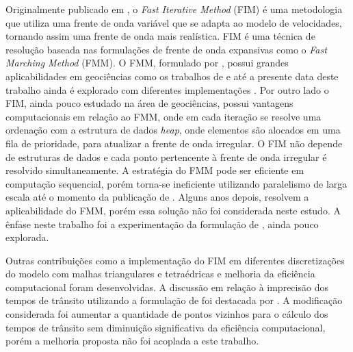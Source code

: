 Originalmente publicado em , o \textit{Fast Iterative Method} (FIM) é uma metodologia que utiliza uma frente de onda variável que se adapta ao modelo de velocidades, tornando assim uma frente de onda mais realística. FIM é uma técnica de resolução baseada nas formulações de frente de onda expansivas como o \textit{Fast Marching Method} (FMM). O FMM, formulado por , possui grandes aplicabilidades em geociências como os trabalhos de  e até a presente data deste trabalho ainda é explorado com diferentes implementações \cite{white2020pykonal, chenpyekfmm2023}. Por outro lado o FIM, ainda pouco estudado na área de geociências, possui vantagens computacionais em relação ao FMM, onde em cada iteração se resolve uma ordenação com a estrutura de dados \textit{heap}, onde elementos são alocados em uma fila de prioridade, para atualizar a frente de onda irregular. O FIM não depende de estruturas de dados e cada ponto pertencente à frente de onda irregular é resolvido simultaneamente. A estratégia do FMM pode ser eficiente em computação sequencial, porém torna-se ineficiente utilizando paralelismo de larga escala até o momento da publicação de . Alguns anos depois,  resolvem a aplicabilidade do FMM, porém essa solução não foi considerada neste estudo. A ênfase neste trabalho foi a experimentação da formulação de , ainda pouco explorada. 

Outras contribuições como a implementação do FIM em diferentes discretizações do modelo com malhas triangulares e tetraédricas \cite{fu2011fast, fu2013fast} e melhoria da eficiência computacional \cite{dang2014fast, hong2016multi, hong2022mg} foram desenvolvidas. A discussão em relação à imprecisão dos tempos de trânsito utilizando a formulação de  foi destacada por . A modificação considerada foi aumentar a quantidade de pontos vizinhos para o cálculo dos tempos de trânsito sem diminuição significativa da eficiência computacional, porém a melhoria proposta não foi acoplada a este trabalho. 

